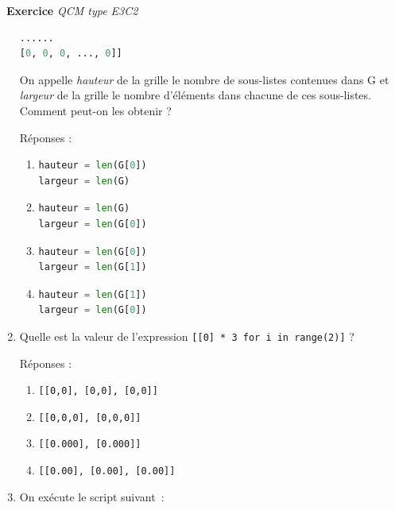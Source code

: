 \documentclass[a4paper, french, 12pt]{article}
\newcounter{exo}
\newenvironment{exercice}[1]
{\par \medskip   \addtocounter{exo}{1} \noindent  
\begin{bclogo}[arrondi =0.1,   noborder = true, logo=\bccrayon, marge=4]{~\textbf{Exercice} \textbf{\theexo} {\itshape #1} }  \par}
{
\end{bclogo}
 \par \bigskip }
\begin{document}
\begin{exercice}{QCM type E3C2}
\begin{enumerate}
\begin{lstlisting}[language=Python]
......
[0, 0, 0, ..., 0]]
\end{lstlisting}

On appelle \emph{hauteur} de la grille le nombre de sous-listes
contenues dans G et \emph{largeur} de la grille le nombre d'éléments
dans chacune de ces sous-listes. Comment peut-on les obtenir ?

Réponses :

\begin{enumerate}
\item
  

\begin{lstlisting}[language=Python]
hauteur = len(G[0])
largeur = len(G)
\end{lstlisting}

\item 

\begin{lstlisting}[language=Python]
hauteur = len(G)
largeur = len(G[0])
\end{lstlisting}

\item 

\begin{lstlisting}[language=Python]
hauteur = len(G[0])
largeur = len(G[1])
\end{lstlisting}

\item 

\begin{lstlisting}[language=Python]
hauteur = len(G[1])
largeur = len(G[0])
\end{lstlisting}
\end{enumerate}


\item 
Quelle est la valeur de l'expression
\lstinline![[0] * 3 for i in range(2)]! ?

Réponses :

\begin{multicols}{2}
\begin{enumerate}

\item
 \lstinline![[0,0], [0,0], [0,0]]!
\item
 \lstinline![[0,0,0], [0,0,0]]!
\item
\lstinline![[0.000], [0.000]]!
\item
 \lstinline![[0.00], [0.00], [0.00]]!
\end{enumerate}
\end{multicols}


\item On exécute le script suivant~:


\end{enumerate}
\end{exercice}
\end{document}
